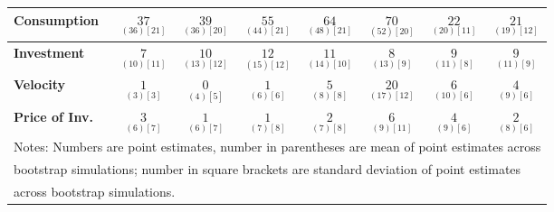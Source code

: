 \documentclass{article}
\begin{document}
\begin{tabular}{|l|c|@{}c|c|@{}c|c|@{}c|c|}
 \textbf{Consumption} & $\underset{( 36) [ 21]}{ 37}$ & $\underset{( 36) [ 20]}{ 39}$ & $\underset{( 44) [ 21]}{ 55}$ & $\underset{( 48) [ 21]}{ 64}$ & $\underset{( 52) [ 20]}{ 70}$ & $\underset{( 20) [ 11]}{ 22}$ & $\underset{( 19) [ 12]}{ 21}$ \\ \hline 
 \textbf{Investment} & $\underset{( 10) [ 11]}{  7}$ & $\underset{( 13) [ 12]}{ 10}$ & $\underset{( 15) [ 12]}{ 12}$ & $\underset{( 14) [ 10]}{ 11}$ & $\underset{( 13) [  9]}{  8}$ & $\underset{( 11) [  8]}{  9}$ & $\underset{( 11) [  9]}{  9}$ \\ \hline 
 \textbf{Velocity} & $\underset{(  3) [  3]}{  1}$ & $\underset{(  4) [  5]}{  0}$ & $\underset{(  6) [  6]}{  1}$ & $\underset{(  8) [  8]}{  5}$ & $\underset{( 17) [ 12]}{ 20}$ & $\underset{( 10) [  6]}{  6}$ & $\underset{(  9) [  6]}{  4}$ \\ \hline 
 \textbf{Price of Inv.} & $\underset{(  6) [  7]}{  3}$ & $\underset{(  6) [  7]}{  1}$ & $\underset{(  7) [  8]}{  1}$ & $\underset{(  7) [  8]}{  2}$ & $\underset{(  9) [ 11]}{  6}$ & $\underset{(  9) [  6]}{  4}$ & $\underset{(  8) [  6]}{  2}$ \\ \hline 
 \multicolumn{8}{|l|}{Notes: Numbers are point estimates, number in 
 parentheses are mean of point estimates across} \\ \hline 
 \multicolumn{8}{|l|}{bootstrap simulations; number in square brackets are 
 standard deviation of point estimates} \\ \hline 
 \multicolumn{8}{|l|}{across bootstrap simulations.} \\ \hline 
 \end{tabular} 
\end{document}
